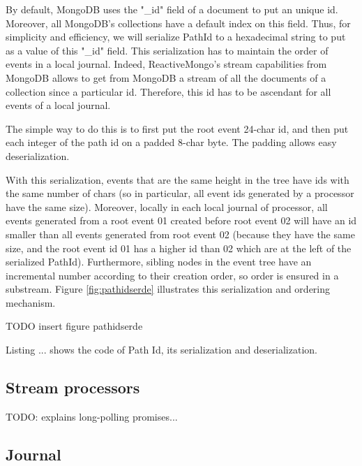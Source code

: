 By default, MongoDB uses the "_id" field of a document to put an unique id. Moreover, all MongoDB's collections have a default index on this field. Thus,
for simplicity and efficiency, we will serialize PathId to a hexadecimal string to put as a value of this "_id" field. This serialization has to maintain the order
of events in a local journal. Indeed, ReactiveMongo's stream capabilities from MongoDB allows to get from MongoDB a stream of all the documents of a collection since a particular id. Therefore, this id has to be ascendant for all events of a local journal.

The simple way to do this is to first put the root event 24-char id, and then put each integer of the path id on a padded 8-char byte. The padding allows easy deserialization.

With this serialization, events that are the same height in the tree have ids with the same number of chars (so in particular, all event ids generated by a processor have the same size). Moreover, locally in each local journal of processor, all events generated from a root event 01 created before root event 02 will have an id smaller than all events
generated from root event 02 (because they have the same size, and the root event id 01 has a higher id than 02 which are at the left of the serialized PathId). Furthermore,
sibling nodes in the event tree have an incremental number according to their creation order, so order is ensured in a substream. Figure \ref{fig:pathidserde} illustrates this serialization and ordering mechanism.

TODO insert figure pathidserde

Listing ... shows the code of Path Id, its serialization and deserialization.

\subsection{Stream processors}




TODO: explains long-polling promises...

\subsection{Journal}



